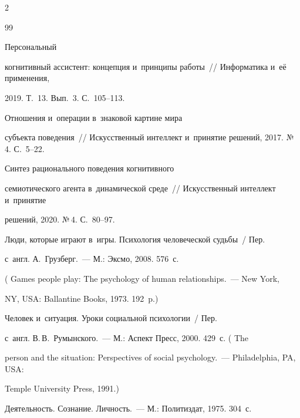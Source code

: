 \begin{multicols}{2}
  

{\small\frenchspacing

 {%


 \begin{thebibliography}{99}


   Персональный 

когнитивный ассистент: концепция и~принципы работы~// Информатика и~её применения, 

2019. Т.~13. Вып.~3. С.~105--113.


   Отношения и~операции в~знаковой картине мира 

субъекта поведения~// Искусственный интеллект и~принятие решений, 2017. №\,4. С.~5--22.


   Синтез рационального поведения когнитивного 

семиотического агента в~динамической среде~// Искусственный интеллект и~принятие 

решений, 2020. №\,4. С.~80--97.


   Люди, которые играют в~игры. Психология человеческой судьбы~/ Пер. 

  с~англ. А.~Грузберг.~--- М.: Эксмо, 2008. 576~с.

  (  Games people play: The psychology of human relationships.~--- New York, 

NY, USA: Ballantine Books, 1973. 192~p.)


   Человек и~ситуация. Уроки социальной психологии~/ Пер. 

с~англ. В.\,В.~Румынского.~--- М.: Аспект Пресс, 2000. 429~с. ( The 

person and the situation: Perspectives of social psychology.~--- Philadelphia, PA, USA:  

Temple University Press, 1991.)


   Деятельность. Сознание. Личность.~--- М.: Политиздат, 1975. 304~с.


\end{thebibliography}}}
\end{multicols}
